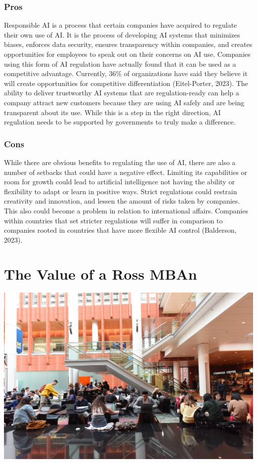 \documentclass[
]{book}
\begin{document}
\hypertarget{pros}{%
\subsection{Pros}\label{pros}}

Responsible AI is a process that certain companies have acquired to regulate their own use of AI. It is the process of developing AI systems that minimizes biases, enforces data security, ensures transparency within companies, and creates opportunities for employees to speak out on their concerns on AI use. Companies using this form of AI regulation have actually found that it can be used as a competitive advantage. Currently, 36\% of organizations have said they believe it will create opportunities for competitive differentiation (Eitel-Porter, 2023). The ability to deliver trustworthy AI systems that are regulation-ready can help a company attract new customers because they are using AI safely and are being transparent about its use. While this is a step in the right direction, AI regulation needs to be supported by governments to truly make a difference.

\hypertarget{cons}{%
\subsection{Cons}\label{cons}}

While there are obvious benefits to regulating the use of AI, there are also a number of setbacks that could have a negative effect. Limiting its capabilities or room for growth could lead to artificial intelligence not having the ability or flexibility to adapt or learn in positive ways. Strict regulations could restrain creativity and innovation, and lessen the amount of risks taken by companies. This also could become a problem in relation to international affairs. Companies within countries that set stricter regulations will suffer in comparison to companies rooted in countries that have more flexible AI control (Balderson, 2023).

\hypertarget{the-value-of-a-ross-mban}{%
\chapter{The Value of a Ross MBAn}\label{the-value-of-a-ross-mban}}

\includegraphics{images/RossStudentsPhoto.jpg}
\end{document}
